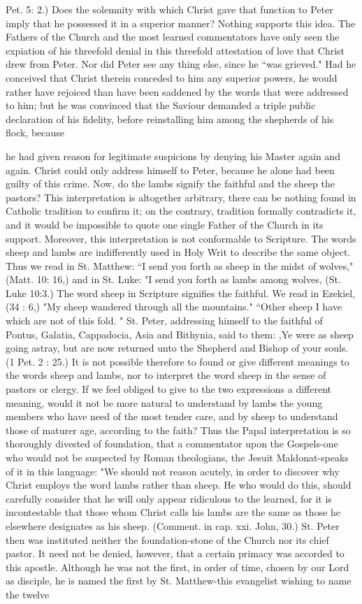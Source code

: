 Pet. 5: 2.) Does the solemnity with which Christ gave that function to Peter imply that he possessed it in a superior manner? Nothing supports this idea. The Fathers of the Church and the most learned commentators have only seen the expiation of his threefold denial in this threefold attestation of love that Christ drew from Peter. Nor did Peter see any thing else, since he “was grieved." Had he conceived that Christ therein conceded to him any superior powers, he would rather have rejoiced than have been saddened by the words that were addressed to him; but he was convinced that the Saviour demanded a triple public declaration of his fidelity, before reinstalling him among the shepherds of his flock, because

he had given reason for legitimate suspicions by denying his Master again and again. Christ could only address himself to Peter, because he alone had been guilty of this crime. Now, do the lambs signify the faithful and the sheep the pastors? This interpretation is altogether arbitrary, there can be nothing found in Catholic tradition to confirm it; on the contrary, tradition formally contradicts it, and it would be impossible to quote one single Father of the Church in its support. Moreover, this interpretation is not conformable to Scripture. The words sheep and lambs are indifferently used in Holy Writ to describe the same object. Thus we read in St. Matthew: “I send you forth as sheep in the midst of wolves," (Matt. 10: 16,) and in St. Luke: "I send you forth as lambs among wolves, (St. Luke 10:3.) The word sheep in Scripture signifies the faithful. We read in Ezekiel, (34 : 6,) "My sheep wandered through all the mountains." “Other sheep I have which are not of this fold. " St. Peter, addressing himself to the faithful of Pontus, Galatia, Cappadocia, Asia and Bithynia, said to them: ,Ye were as sheep going astray, but are now returned unto the Shepherd and Bishop of your souls. (1 Pet. 2 : 25.) It is not possible therefore to found or give different meanings to the words sheep and lambs, nor to interpret the word sheep in the sense of pastors or clergy. If we feel obliged to give to the two expressions a different meaning, would it not be more natural to understand by lambs the young members who have need of the most tender care, and by sheep to understand those of maturer age, according to the faith? Thus the Papal interpretation is so thoroughly divested of foundation, that a commentator upon the Gospels-one who would not be suspected by Roman theologians, the Jesuit Maldonat-speaks of it in this language: "We should not reason acutely, in order to discover why Christ employs the word lambs rather than sheep. He who would do this, should carefully consider that he will only appear ridiculous to the learned, for it is incontestable that those whom Christ calls his lambs are the same as those he elsewhere designates as his sheep. (Comment. in cap. xxi. John, 30.) St. Peter then was instituted neither the foundation-stone of the Church nor its chief pastor. It need not be denied, however, that a certain primacy was accorded to this apostle. Although he was not the first, in order of time, chosen by our Lord as disciple, he is named the first by St. Matthew-this evangelist wishing to name the twelve 